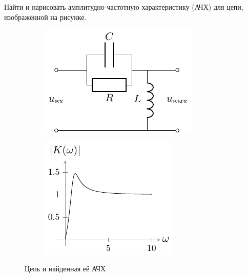 \begin{task}
	Найти и нарисовать амплитудно-частотную характеристику (АЧХ) для цепи, изображённой на рисунке. 
\end{task}

\begin{figure}[ht]
  \centering
  \begin{subfigure}[b]{0.5\linewidth}
    \centering\includegraphics[scale=2]{chem/task7}
    \vspace{0.15em}
  \end{subfigure}%
  \begin{subfigure}[b]{0.5\linewidth}
    \centering\includegraphics[scale=2]{ris/task7_out2}
  \end{subfigure}%
  \caption{Цепь и найденная её АЧХ}
\end{figure}

